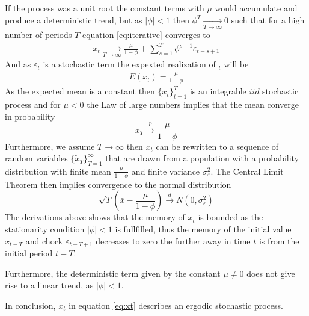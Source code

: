 If the process was a unit root the constant terms with $\mu$ would accumulate and produce a deterministic trend, but as $|\phi|<1$ then $\phi^T\xrightarrow[T\rightarrow\infty]{}0$ such that for a high number of periods $T$ equation \ref{eq:iterative} converges to
\begin{equation}
  \begin{split}
    x_t \xrightarrow[T\rightarrow\infty]{} \frac{\mu}{1-\phi} + \sum_{s=1}^T \phi^{s-1}\varepsilon_{t-s+1}
  \end{split}
\end{equation}
And as $\varepsilon_t$ is a stochastic term the expexted realization of $_t$ will be
\begin{equation}
  \begin{split}
    E(x_t) = \frac{\mu}{1-\phi}
    \label{eq:mean}
  \end{split}
\end{equation}
As the expected mean is a constant then $\{x_t\}_{t=1}^T$ is an integrable $iid$ stochastic process and for $\mu<0$ the Law of large numbers implies that the mean converge in probability
\begin{equation}
  \bar{x}_T\xrightarrow{p}\frac{\mu}{1-\phi}
\end{equation}
Furthermore, we assume $T\rightarrow\infty$ then $x_t$ can be rewritten to a sequence of random variables $\{\tilde{x}_T\}_{T=1}^\infty$ that are drawn   from a population with a probability distribution with finite mean $\frac{\mu}{1-\phi}$ and finite variance $\sigma_\varepsilon^2$. The Central Limit Theorem then implies convergence to the normal distribution
\begin{equation}
  \sqrt{T}\left(\bar{x}-\frac{\mu}{1-\phi}\right) \xrightarrow{d}N(0,\sigma_\varepsilon^2)
\end{equation}
The derivations above shows that the memory of $x_t$ is bounded as the stationarity condition $|\phi|<1$ is fullfilled, thus the memory of the initial value $x_{t-T}$ and chock $\varepsilon_{t-T+1}$ decreases to zero the further away in time $t$ is from the initial period $t-T$.

Furthermore, the deterministic term given by the constant $\mu\neq0$ does not give rise to a linear trend, as $|\phi|<1$.

In conclusion, $x_t$ in equation \ref{eq:xt} describes an ergodic stochastic process.

